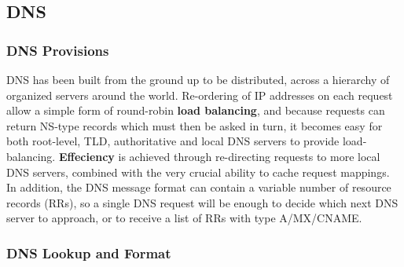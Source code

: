 \subsection{DNS}
\subsubsection{DNS Provisions}
DNS has been built from the ground up to be distributed, across a hierarchy of organized servers around
the world. Re-ordering of IP addresses on each request allow a simple form of round-robin \textbf{load
balancing}, and because requests can return NS-type records which must then be asked in turn, it becomes
easy for both root-level, TLD, authoritative and local DNS servers to provide load-balancing.
\textbf{Effeciency} is achieved through re-directing requests to more local DNS servers, combined with 
the very crucial ability to cache request mappings. In addition, the DNS message format can contain a
variable number of resource records (RRs), so a single DNS request will be enough to decide which next
DNS server to approach, or to receive a list of RRs with type A/MX/CNAME.

\subsubsection{DNS Lookup and Format}